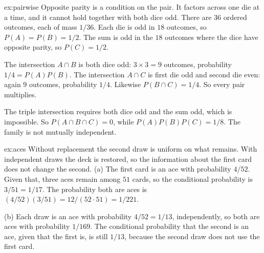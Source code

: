\begin{solution}{ex:pairwise}
\idea Opposite parity is a condition on the pair. It factors across one die at a time, and it cannot hold together with both dice odd.
\writeup There are $36$ ordered outcomes, each of mass $1/36$. Each die is odd in $18$ outcomes, so $P(A)=P(B)=1/2$. The sum is odd in the $18$ outcomes where the dice have opposite parity, so $P(C)=1/2$.

The intersection $A\cap B$ is both dice odd: $3\times3=9$ outcomes, probability $1/4=P(A)P(B)$. The intersection $A\cap C$ is first die odd and second die even: again $9$ outcomes, probability $1/4$. Likewise $P(B\cap C)=1/4$. So every pair multiplies.

The triple intersection requires both dice odd and the sum odd, which is impossible. So $P(A\cap B\cap C)=0$, while $P(A)P(B)P(C)=1/8$. The family is not mutually independent.
\end{solution}

\begin{solution}{ex:aces}
\idea Without replacement the second draw is uniform on what remains. With independent draws the deck is restored, so the information about the first card does not change the second.
\writeup (a) The first card is an ace with probability $4/52$. Given that, three aces remain among $51$ cards, so the conditional probability is $3/51=1/17$. The probability both are aces is $(4/52)(3/51)=12/(52\cdot51)=1/221$.

(b) Each draw is an ace with probability $4/52=1/13$, independently, so both are aces with probability $1/169$. The conditional probability that the second is an ace, given that the first is, is still $1/13$, because the second draw does not use the first card.
\end{solution}

